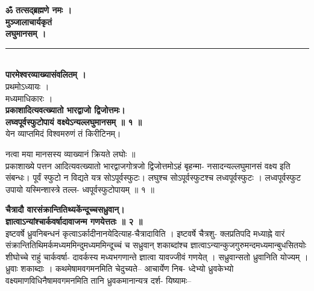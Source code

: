\documentclass[11pt, openany]{book}
\begin{document}
\newpage
\thispagestyle{empty}
\begin{center}
\vspace{1cm}
\textbf{ ॐ तत्सद्ब्रह्मणे नमः ।}\\
\vspace{2mm}
\textbf{ मुञ्जालाचार्यकृतं}\\
\vspace{3mm}
{\huge{\textbf{ लघुमानसम् ।}}}\\
\rule{0.3\linewidth}{1.0pt}\\
\vspace{2mm}
\textbf{ पारमेश्वरव्याख्यासंवलितम् ।}\\
\vspace{2mm}
 प्रथमोऽध्यायः ।\\
\vspace{2mm}
 मध्यमाधिकारः ।\\
\vspace{3mm}
\centering\noindent
\hspace{-0.7cm}
{\textbf{ प्रकाशादित्यवत्ख्यातो भारद्वाजो द्विजोत्तमः।\\
 लघ्वपूर्वस्फुटोपायं वक्ष्येऽन्यल्लघुमानसम् ॥ १ ॥}}\\
\vspace{2mm}
\hspace{-1cm}
 येन व्याप्तमिदं विश्वमरुणं तं किरीटिनम्।

 नत्वा मया मानसस्य व्याख्यानं क्रियते लघोः ॥\\

\vspace{2mm}
\justifying
 प्रकाशाख्ये पत्तन आदित्यवत्ख्यातो भारद्वाजगोत्रजो द्विजोत्तमोऽहं
बृहन्मा-
नसादन्यल्लघुमानसं वक्ष्य इति संबन्धः। पूर्वं स्फुटो न विद्यते यत्र
सोऽपूर्वस्फुटः।
लघुश्च सोऽपूर्वस्फुटश्च लध्वपूर्वस्फुटः । लध्वपूर्वस्फुट उपायो
यस्मिन्शास्त्रे तल्ल-
ध्वपूर्वस्फुटोपायम् ॥ १ ॥

\vspace{2mm}
\centering
\hspace{-1.5cm}
{\textbf{ चैत्रादौ वारसंक्रान्तितिथ्यकेंन्दूच्चसध्रुवान्।\\
ज्ञात्वाऽन्यांश्चार्कवर्षादावाजन्म गणयेत्ततः ॥ २ ॥}}\\

\vspace{2mm}
\justifying
 इष्टवर्षे ध्रुवनिबन्धनं
 कृत्वाऽर्कादीनानयेदित्याह-चैत्रादाविति ।  
इष्टवर्षे चैत्रशु-
क्लप्रतिपदि मध्याह्ने वारं संक्रान्तितिथिमर्कमध्यममिन्दुमध्यममिन्दूच्चं
च सध्रुवान्
शकाब्दांश्च ज्ञात्वाऽन्यान्कुजगुरुमन्दमध्यमान्बुधसितयोः शीघोच्चे राहुं
चार्कवर्षा-
दावर्कस्य मध्यभगणान्ते ज्ञात्वा यावज्जीवं गणयेत् ।  सध्रुवान्सतो
ध्रुवानिति
योज्यम्  ।  ध्रुवाः शकाब्दाः । कथमेषामवगमनमिति चेदुच्यते--
आचार्येण निब-
ध्देभ्यो ध्रुवकेभ्यो वक्ष्यमाणविधिनैषामवगमनमिति तानि ध्रुवकमानान्यत्र
दर्श-
यिष्यामः--
\end{center}
\end{document}
